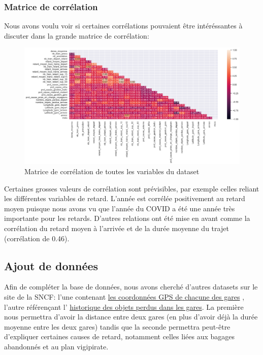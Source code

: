 \documentclass{article}
\begin{document}
\subsubsection{Matrice de corrélation}
Nous avons voulu voir si certaines corrélations pouvaient être intéréssantes à discuter dans la grande matrice de corrélation: 

\begin{figure}[H]
    \centering
    \includegraphics[scale=0.45]{corr_all.png}
    \caption{Matrice de corrélation de toutes les variables du dataset}
\end{figure}

Certaines grosses valeurs de corrélation sont prévisibles, par exemple celles reliant les différentes variables de retard. L'année est corrélée positivement au retard moyen puisque nous avons vu que l'année du COVID a été une année très importante pour les retards. 
D'autres relations ont été mise en avant comme la corrélation du retard moyen à l'arrivée et de la durée moyenne du trajet (corrélation de 0.46).

\subsection{Ajout de données}

Afin de compléter la base de données, nous avons cherché d'autres datasets sur le site de la SNCF: l'une contenant \href{https://ressources.data.sncf.com/explore/dataset/referentiel-gares-voyageurs/table/}{les coordonnées GPS de chacune des gares} , l'autre référençant l' \href{https://ressources.data.sncf.com/explore/dataset/objets-trouves-restitution/table/}{historique des objets perdus dans les gares}. La première nous permettra d'avoir la distance entre deux gares (en plus d'avoir déjà la durée moyenne entre les deux gares) tandis que la seconde permettra peut-être d'expliquer certaines causes de retard, notamment celles liées aux bagages abandonnés et au plan vigipirate. 
\end{document}
